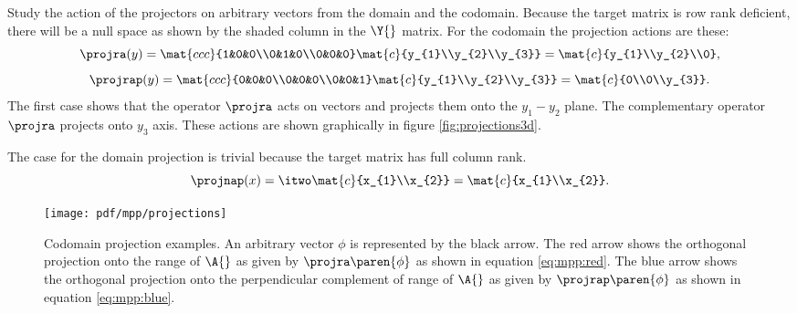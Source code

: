 Study the action of the projectors on arbitrary vectors from the domain and the codomain. Because the target matrix is row rank deficient, there will be a null space as shown by the shaded column in the $\Y{}$ matrix. For the codomain the projection actions are these:
\begin{equation}
  \projra (y) = \mat{ccc}{1&0&0\\0&1&0\\0&0&0} 
     \mat{c}{y_{1}\\y_{2}\\y_{3}} = \mat{c}{y_{1}\\y_{2}\\0},
     \label{eq:mpp:red}
\end{equation}
\begin{equation}
  \projrap (y) = \mat{ccc}{0&0&0\\0&0&0\\0&0&1} 
     \mat{c}{y_{1}\\y_{2}\\y_{3}} = \mat{c}{0\\0\\y_{3}}.
     \label{eq:mpp:blue}
\end{equation}
The first case shows that the operator $\projra$ acts on vectors and projects them onto the $y_{1}-y_{2}$ plane. The complementary operator $\projra$ projects onto $y_{3}$ axis. These actions are shown graphically in figure \eqref{fig:projections3d}.

The case for the domain projection is trivial because the target matrix has full column rank.
\begin{equation}
  \projnap (x) = \itwo \mat{c}{x_{1}\\x_{2}} = \mat{c}{x_{1}\\x_{2}}.
\end{equation}

\begin{figure}[htbp] %
   \centering
   \texttt{[image: pdf/mpp/projections]} 
   \caption{Codomain projection examples. An arbitrary vector $\phi$ is represented by the black arrow. The red arrow shows the orthogonal projection onto the range of $\A{}$ as given by $\projra\paren{\phi}$ as shown in equation \eqref{eq:mpp:red}. The blue arrow shows the orthogonal projection onto the perpendicular complement of range of $\A{}$ as given by $\projrap\paren{\phi}$ as shown in equation \eqref{eq:mpp:blue}.}
   \label{fig:projections3d}
\end{figure}

